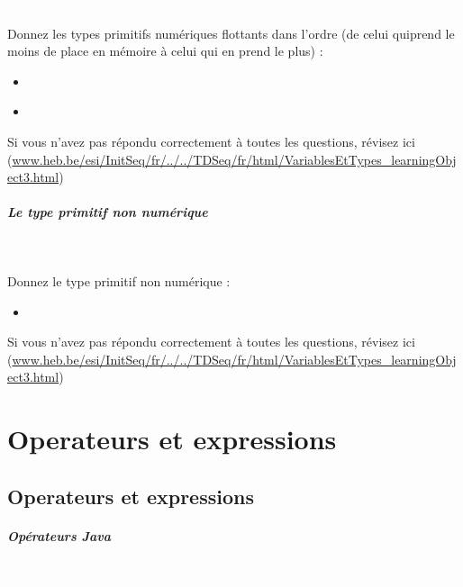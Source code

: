 \documentclass[11pt,a4paper]{article}
\begin{document}
                \textcolor{white}{.} \par
             
								Donnez les types primitifs num\'eriques flottants dans l'ordre (de celui quiprend le moins de place en m\'emoire \`a celui qui en prend le plus) :
							
					\begin{itemize}
				
			\item  \textcolor{gray}{\underline{\hspace*{3em}}} 
			\item  \textcolor{gray}{\underline{\hspace*{5em}}} 
					\end{itemize}
				Si vous n'avez pas r\'epondu correctement \`a toutes les questions, 
				    r\'evisez ici (\url{www.heb.be/esi/InitSeq/fr/../../TDSeq/fr/html/VariablesEtTypes\_learningObject3.html})
            \par
        
			
		\subparagraph{Le type primitif non num\'erique} 
		
                \textcolor{white}{.} \par
             
								Donnez le type primitif non num\'erique :
							
					\begin{itemize}
				
			\item  \textcolor{gray}{\underline{\hspace*{5em}}} 
					\end{itemize}
				Si vous n'avez pas r\'epondu correctement \`a toutes les questions, 
          r\'evisez ici (\url{www.heb.be/esi/InitSeq/fr/../../TDSeq/fr/html/VariablesEtTypes\_learningObject3.html})
            \par
        \section{Operateurs et expressions}\subsection{Operateurs et expressions}
			
		\subparagraph{Op\'erateurs Java} 
		
                \textcolor{white}{.} \par
            
\end{document}
